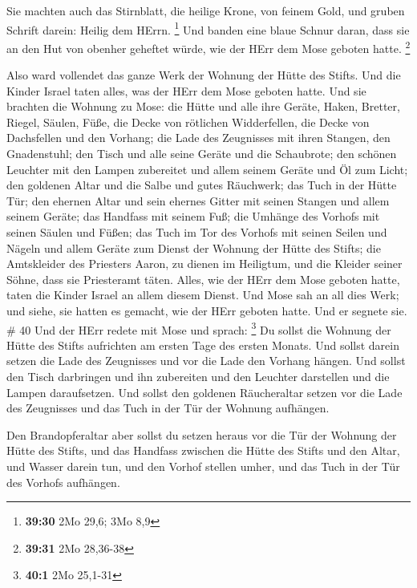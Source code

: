  Sie machten auch das Stirnblatt, die heilige Krone, von
feinem Gold, und gruben Schrift darein: Heilig dem HErrn. \footnote{\textbf{39:30}
  2Mo 29,6; 3Mo 8,9}  Und banden eine blaue Schnur daran,
dass sie an den Hut von obenher geheftet würde, wie der HErr dem Mose
geboten hatte. \footnote{\textbf{39:31} 2Mo 28,36-38}

 Also ward vollendet das ganze Werk der Wohnung der Hütte
des Stifts. Und die Kinder Israel taten alles, was der HErr dem Mose
geboten hatte.  Und sie brachten die Wohnung zu Mose: die
Hütte und alle ihre Geräte, Haken, Bretter, Riegel, Säulen, Füße,
 die Decke von rötlichen Widderfellen, die Decke von
Dachsfellen und den Vorhang;  die Lade des Zeugnisses mit
ihren Stangen, den Gnadenstuhl;  den Tisch und alle seine
Geräte und die Schaubrote;  den schönen Leuchter mit den
Lampen zubereitet und allem seinem Geräte und Öl zum Licht;
 den goldenen Altar und die Salbe und gutes Räuchwerk; das
Tuch in der Hütte Tür;  den ehernen Altar und sein ehernes
Gitter mit seinen Stangen und allem seinem Geräte; das Handfass mit
seinem Fuß;  die Umhänge des Vorhofs mit seinen Säulen und
Füßen; das Tuch im Tor des Vorhofs mit seinen Seilen und Nägeln und
allem Geräte zum Dienst der Wohnung der Hütte des Stifts; 
die Amtskleider des Priesters Aaron, zu dienen im Heiligtum, und die
Kleider seiner Söhne, dass sie Priesteramt täten.  Alles,
wie der HErr dem Mose geboten hatte, taten die Kinder Israel an allem
diesem Dienst.  Und Mose sah an all dies Werk; und siehe,
sie hatten es gemacht, wie der HErr geboten hatte. Und er segnete sie.
\# 40  Und der HErr redete mit Mose und sprach: \footnote{\textbf{40:1}
  2Mo 25,1-31}  Du sollst die Wohnung der Hütte des Stifts
aufrichten am ersten Tage des ersten Monats.  Und sollst
darein setzen die Lade des Zeugnisses und vor die Lade den Vorhang
hängen.  Und sollst den Tisch darbringen und ihn zubereiten
und den Leuchter darstellen und die Lampen daraufsetzen. 
Und sollst den goldenen Räucheraltar setzen vor die Lade des Zeugnisses
und das Tuch in der Tür der Wohnung aufhängen.

 Den Brandopferaltar aber sollst du setzen heraus vor die
Tür der Wohnung der Hütte des Stifts,  und das Handfass
zwischen die Hütte des Stifts und den Altar, und Wasser darein tun,
 und den Vorhof stellen umher, und das Tuch in der Tür des
Vorhofs aufhängen.

